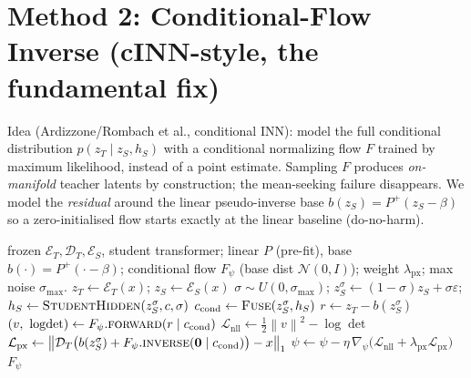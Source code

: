 \documentclass[11pt,a4paper]{article}
\newcommand{\N}{\mathcal{N}}
\newcommand{\Enc}{\mathcal{E}}
\newcommand{\Dec}{\mathcal{D}}
\newcommand{\norm}[1]{\left\lVert #1 \right\rVert}
\newcommand{\zT}{z_{T}}
\newcommand{\zS}{z_{S}}
\newcommand{\hS}{h_{S}}
\begin{document}
\section{Method 2: Conditional-Flow Inverse (cINN-style, the fundamental fix)}
\label{sec:flow}

Idea (Ardizzone/Rombach et al., conditional INN): model the full conditional distribution
$p(\zT\mid\zS,\hS)$ with a conditional normalizing flow $F$ trained by maximum likelihood,
instead of a point estimate. Sampling $F$ produces \emph{on-manifold} teacher latents by
construction; the mean-seeking failure disappears. We model the \emph{residual} around the
linear pseudo-inverse base $b(\zS)=P^{+}(\zS-\beta)$ so a zero-initialised flow starts exactly
at the linear baseline (do-no-harm).

\begin{algorithm}[ht]
\caption{Conditional-Flow Inverse --- offline training (NLL)}
\label{alg:flow-train}
\begin{algorithmic}[1]
\Require frozen $\Enc_T,\Dec_T,\Enc_S$, student transformer; linear $P$ (pre-fit),
base $b(\cdot)=P^{+}(\cdot-\beta)$; conditional flow $F_\psi$ (base dist $\N(0,I)$);
weight $\lambda_{\mathrm{px}}$; max noise $\sigma_{\max}$.
  \State $\zT \gets \Enc_T(x)$; \quad $\zS \gets \Enc_S(x)$
  \State $\sigma\sim U(0,\sigma_{\max})$; \quad $\zS^{\sigma}\gets(1-\sigma)\zS+\sigma\varepsilon$;
         \quad $\hS \gets \textsc{StudentHidden}(\zS^{\sigma},c,\sigma)$
  \State $c_{\mathrm{cond}} \gets \textsc{Fuse}(\zS^{\sigma}, \hS)$ 
  \State $r \gets \zT - b(\zS^{\sigma})$ 
  \State $(v,\ \log\!\det) \gets F_\psi.\textsc{forward}(r \mid c_{\mathrm{cond}})$
  \State $\mathcal{L}_{\mathrm{nll}} \gets \tfrac{1}{2}\norm{v}^2 - \log\!\det$
         \Comment{$-\log p_\psi(\zT\mid\zS,\hS)$ up to const}
  \State $\mathcal{L}_{\mathrm{px}} \gets \norm{\Dec_T\big(b(\zS^{\sigma})+F_\psi.\textsc{inverse}(\mathbf{0}\mid c_{\mathrm{cond}})\big)-x}_1$
  \State $\psi \gets \psi - \eta\,\nabla_\psi\big(\mathcal{L}_{\mathrm{nll}}+\lambda_{\mathrm{px}}\mathcal{L}_{\mathrm{px}}\big)$
\EndFor
\State \Return $F_\psi$
\end{algorithmic}
\end{algorithm}
\end{document}
